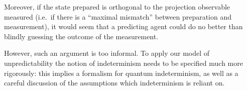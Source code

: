 \documentclass[%
 superscriptaddress,
 preprint,
 showpacs,
 showkeys,
 preprintnumbers,
  amsmath,amssymb,
  aps,
 pra,
  longbibliography,
  floatfix,
 ]{revtex4-1}
\theoremstyle{definition}
\begin{document}





Moreover, if the state prepared is orthogonal to the projection observable measured
(i.e.\ if there is a ``maximal mismatch'' between preparation
and  measurement),
it would seem that a predicting agent could do no better than blindly guessing the outcome of the measurement.



However, such an argument is  too informal. To apply our model of unpredictability the notion of indeterminism needs to be specified much more rigorously: this implies a formalism for quantum indeterminism, as well as a careful discussion of the assumptions which indeterminism is reliant on.
\end{document}
